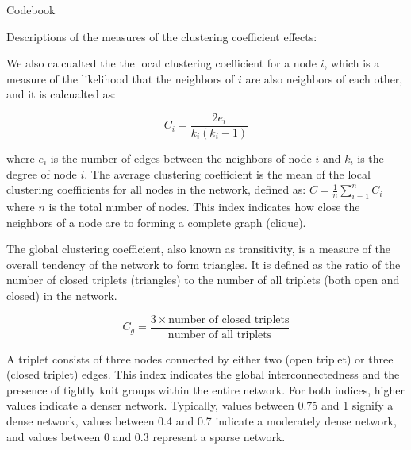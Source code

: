 \documentclass[11pt]{article}
\begin{document}
\begin{table}[H]
  \begin{center}
    \begin{scriptsize}
    \caption{Codebook}
    \label{tab:codebook}
      
  
    \end{scriptsize}
  \end{center}
\end{table}


Descriptions of the measures of the clustering coefficient effects:

We also calcualted the the local clustering coefficient for a node $i$, which is a measure of the likelihood that the neighbors of $i$ are also neighbors of each other, and it is calcualted as:

\begin{equation*}
  C_i = \frac{2e_i}{k_i(k_i - 1)}  
\end{equation*}

where $e_i$ is the number of edges between the neighbors of node $i$ and $k_i$ is the degree of node $i$. The average clustering coefficient is the mean of the local clustering coefficients for all nodes in the network, defined as: $C = \frac{1}{n} \sum_{i=1}^n C_i$ where $n$ is the total number of nodes. This index indicates how close the neighbors of a node are to forming a complete graph (clique).

The global clustering coefficient, also known as transitivity, is a measure of the overall tendency of the network to form triangles. It is defined as the ratio of the number of closed triplets (triangles) to the number of all triplets (both open and closed) in the network.

\begin{equation*}
  C_g = \frac{3 \times \text{number of closed triplets}}{\text{number of all triplets}}  
\end{equation*}

A triplet consists of three nodes connected by either two (open triplet) or three (closed triplet) edges. This index indicates the global interconnectedness and the presence of tightly knit groups within the entire network. For both indices, higher values indicate a denser network. Typically, values between 0.75 and 1 signify a dense network, values between 0.4 and 0.7 indicate a moderately dense network, and values between 0 and 0.3 represent a sparse network.
\end{document}

